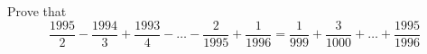 Prove that\[\frac{1995}{2}-\frac{1994}{3}+\frac{1993}{4}-\ldots -\frac{2}{1995}+\frac{1}{1996}=\frac{1}{999}+\frac{3}{1000}+\ldots +\frac{1995}{1996}\]